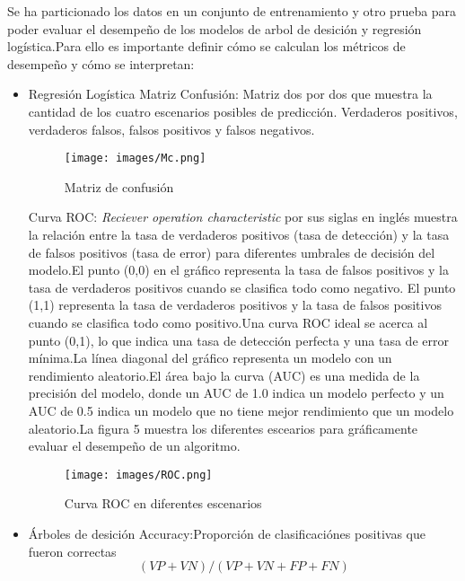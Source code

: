 \documentclass[twocolumn]{bmcart}%
\begin{document}
Se ha particionado los datos en un conjunto de entrenamiento y otro prueba para poder evaluar el desempeño de los modelos de arbol de desición y regresión logística.Para ello es importante definir cómo se calculan los métricos de desempeño y cómo se interpretan: 

\begin{itemize}
 \item Regresión Logística
        \subitem Matriz Confusión: Matriz dos por dos que muestra la cantidad de los cuatro escenarios posibles de predicción. Verdaderos positivos, verdaderos falsos, falsos positivos y falsos negativos.
\begin{figure}[h!]
  \caption{\csentence{}
      Matriz de confusión}
\texttt{[image: images/Mc.png]}  
      \end{figure}
        
        \subitem Curva ROC: \textit{Reciever operation characteristic} por sus siglas en inglés muestra la relación entre la tasa de verdaderos positivos (tasa de detección) y la tasa de falsos positivos (tasa de error) para diferentes umbrales de decisión del modelo.El punto (0,0) en el gráfico representa la tasa de falsos positivos y la tasa de verdaderos positivos cuando se clasifica todo como negativo. El punto (1,1) representa la tasa de verdaderos positivos y la tasa de falsos positivos cuando se clasifica todo como positivo.Una curva ROC ideal se acerca al punto (0,1), lo que indica una tasa de detección perfecta y una tasa de error mínima.La línea diagonal del gráfico representa un modelo con un rendimiento aleatorio.El área bajo la curva (AUC) es una medida de la precisión del modelo, donde un AUC de 1.0 indica un modelo perfecto y un AUC de 0.5 indica un modelo que no tiene mejor rendimiento que un modelo aleatorio.La figura 5 muestra los diferentes escearios para gráficamente evaluar el desempeño de un algoritmo. \cite{SQ5}
        
\begin{figure}[h!]
  \caption{\csentence{}
      Curva ROC en diferentes escenarios}
\texttt{[image: images/ROC.png]}  
      \end{figure}
        
    \item Árboles de desición
        \subitem Accuracy:Proporción de clasificaciónes positivas que fueron correctas 
            \begin{equation}
            (V P+V N) /(V P+V N+F P+F N)
            \end{equation}



\end{itemize}
\end{document}
